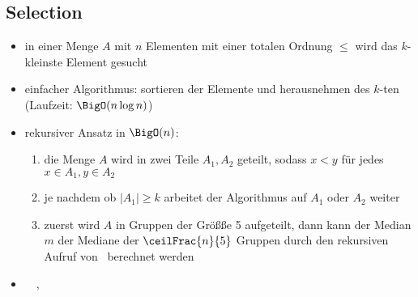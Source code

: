 \subsection{Selection}
\begin{itemize}
	\item in einer Menge $A$ mit $n$ Elementen mit einer totalen Ordnung $\leq$ wird das $k$-kleinste Element gesucht
	\item einfacher Algorithmus: sortieren der Elemente und herausnehmen des $k$-ten (Laufzeit: $\BigO(n\log n)$)
	\item rekursiver Ansatz in $\BigO(n)$:
		\begin{enumerate}
			\item die Menge $A$ wird in zwei Teile $A_1,A_2$ geteilt, sodass $x < y$ für jedes $x \in A_1, y\in A_2$
			\item je nachdem ob $|A_1| \geq k$ arbeitet der Algorithmus auf $A_1$ oder $A_2$ weiter
			\item zuerst wird $A$ in Gruppen der Größße 5 aufgeteilt, dann kann der Median $m$ der Mediane der $\ceilFrac{n}{5}$ Gruppen durch den rekursiven Aufruf von \select~berechnet werden
		\end{enumerate}
	\item \vergleichTwo~~\hspace{-2em},~
\end{itemize}